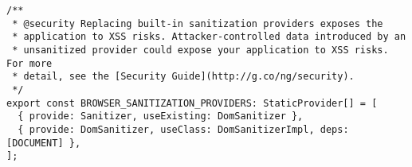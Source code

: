 \begin{verbatim}
/**
 * @security Replacing built-in sanitization providers exposes the
 * application to XSS risks. Attacker-controlled data introduced by an
 * unsanitized provider could expose your application to XSS risks. For more
 * detail, see the [Security Guide](http://g.co/ng/security).
 */
export const BROWSER_SANITIZATION_PROVIDERS: StaticProvider[] = [
  { provide: Sanitizer, useExisting: DomSanitizer },
  { provide: DomSanitizer, useClass: DomSanitizerImpl, deps: [DOCUMENT] },
];
\end{verbatim}
